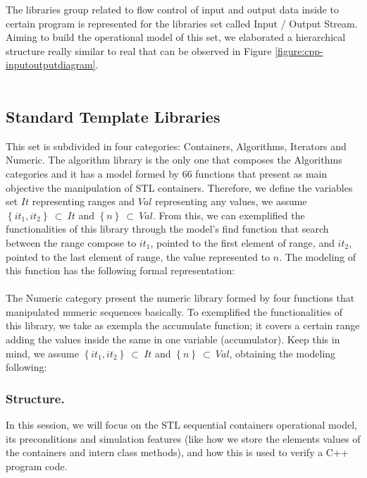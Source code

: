 \documentclass[a4paper]{llncs}
\begin{document}
The libraries group related to flow control of input and output data inside to certain program is represented for the libraries set 
called Input / Output Stream. Aiming to build the operational model of this set, we elaborated a hierarchical structure really similar 
to real that can be observed in Figure \ref{figure:cpp-inputoutputdiagram}.
\\
\\

\subsection{Standard Template Libraries}

This set is subdivided in four categories: Containers, Algorithms, Iterators and Numeric. The algorithm library is the only one that 
composes the Algorithms categories and it has a model formed by 66 functions that present as main objective the manipulation of STL 
containers. Therefore, we define the variables set $It$ representing ranges and $Val$ representing any values, we assume 
$\left\{it_{1}, it_{2}\right\} \:\subset\:It$ and $\left\{n\right\} \:\subset\:Val$. From this, we can exemplified the functionalities 
of this library through the model's find function that search between the range compose to $it_{1}$, pointed to the first element 
of range, and $it_{2}$, pointed to the last element of range, the value represented to $n$. The modeling of this function has the 
following formal representation:
\\
\\
The Numeric category present the numeric library formed by four functions that manipulated numeric sequences basically. 
To exemplified the functionalities of this library, we take as exempla the accumulate function; it covers a certain range adding 
the values inside the same in one variable (accumulator). Keep this in mind, we assume $\left\{it_{1}, it_{2}\right\} \:\subset\:It$ 
and $\left\{n\right\} \:\subset\:Val$, obtaining the modeling following:

\subsubsection{Structure.}

In this session, we will focus on the STL sequential containers operational model, its preconditions and simulation features (like how we store the elements values of the containers and intern class methods), and how this is used to verify a C++ program code.
\end{document}
